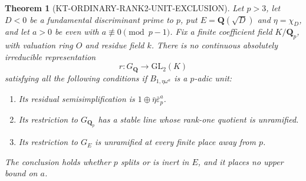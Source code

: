 \documentclass[11pt,a4paper]{article}
\newtheorem{theorem}{Theorem}[section]
\theoremstyle{definition}
\begin{document}
\begin{theorem}[KT-ORDINARY-RANK2-UNIT-EXCLUSION]
Let $p>3$, let $D<0$ be a fundamental discriminant
prime to $p$, put $E=\mathbf Q(\sqrt D)$ and
$\eta=\chi_D$, and let $a>0$ be even with
$a\not\equiv0\pmod{p-1}$.  Fix a finite coefficient
field $K/\mathbf Q_p$, with valuation ring $O$ and
residue field $k$.  There is no continuous
absolutely irreducible representation
\[
                 r:G_{\mathbf Q}\longrightarrow
                                  \mathrm{GL}_2(K)        \tag{OR.1}
\]
satisfying all the following conditions if
$B_{1,\eta\omega^a}$ is a $p$-adic unit:
\begin{enumerate}
\item Its residual semisimplification is
      $1\oplus\bar\eta\bar\varepsilon_p^a$.
\item Its restriction to $G_{\mathbf Q_p}$ has a
      stable line whose rank-one quotient is
      unramified.
\item Its restriction to $G_E$ is unramified at
      every finite place away from $p$.
\end{enumerate}
The conclusion holds whether $p$ splits or is inert
in $E$, and it places no upper bound on $a$.
\end{theorem}
\end{document}
